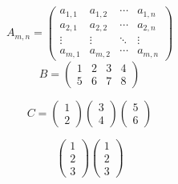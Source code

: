 \documentclass[16pt, a4paper]{article} %
\begin{document}
    \begin{equation*}
    A_{m,n} = 
        \begin{pmatrix}
            a_{1,1} & a_{1,2} & \cdots & a_{1,n} \\
            a_{2,1} & a_{2,2} & \cdots & a_{2,n} \\
            \vdots  & \vdots  & \ddots & \vdots  \\
            a_{m,1} & a_{m,2} & \cdots & a_{m,n} 
        \end{pmatrix}
    \end{equation*}
    \begin{equation*}
    B = 
        \begin{pmatrix}
            1 & 2 & 3 & 4 \\
            5 & 6 & 7 & 8
        \end{pmatrix}
    \end{equation*}
    
    \begin{equation*}
     C = 
        \begin{pmatrix}
         1 \\
         2
        \end{pmatrix}
        \begin{pmatrix}
         3 \\
         4
        \end{pmatrix}
        \begin{pmatrix}
         5 \\
         6
        \end{pmatrix}
    \end{equation*}

    \begin{equation*}
        \begin{pmatrix}
            1 \\
            2 \\
            3
        \end{pmatrix}
        \begin{pmatrix}
            1 \\
            2 \\
            3
            \end{pmatrix}
    \end{equation*}
    
\end{document}
